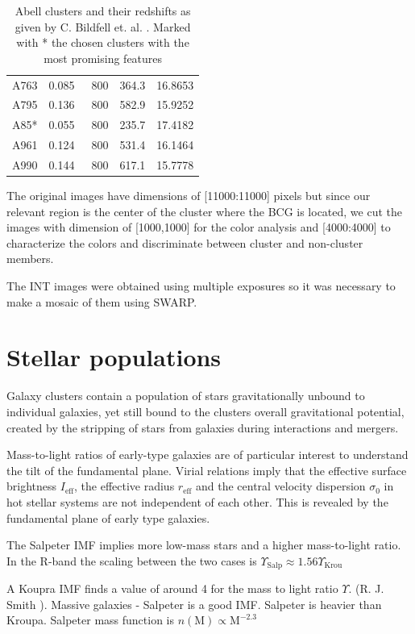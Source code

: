 \begin{table}[]
\begin{tabular}{ccccc}
A763    & 0.085 & ~800           & 364.3 & 16.8653   \\
A795    & 0.136 & ~800           & 582.9 & 15.9252   \\
A85*    & 0.055 & ~800           & 235.7 & 17.4182   \\
A961    & 0.124 & ~800           & 531.4 & 16.1464   \\
A990    & 0.144 & ~800           & 617.1 & 15.7778   
\end{tabular}
\caption[Abell Clusters and their redshift]{Abell clusters and their redshifts as given by C. Bildfell et. al. \citeyear{Reference6}. Marked with * the chosen clusters with the most promising features}
\end{table}

The original images have dimensions of [11000:11000] pixels but since our relevant region is the center of the cluster where the BCG is located, we cut the images with dimension of [1000,1000] for the color analysis and [4000:4000] to characterize the colors and discriminate between cluster and non-cluster members.

The INT images were obtained using multiple exposures so it was necessary to make a mosaic of them using SWARP.

\section{Stellar populations}
 
Galaxy clusters contain a population of stars gravitationally unbound to individual galaxies, yet still bound to the clusters overall gravitational potential, created by the stripping of stars from galaxies during interactions and mergers.

Mass-to-light ratios of early-type galaxies are of particular interest to understand the tilt of the fundamental plane. Virial relations imply that the effective surface brightness $I_{\text{eff}}$, the effective radius $r_{\text{eff}}$ and the central velocity dispersion $\sigma_{0}$ in hot stellar systems are not independent of each other. This is revealed by the fundamental plane of early type galaxies.

The Salpeter IMF implies more low-mass stars and a higher mass-to-light ratio. In the R-band the scaling between the two cases is $\Upsilon_{\text{Salp}}\approx 1.56\Upsilon_{\text{Krou}}$

A Koupra IMF finds a value of around 4 for the mass to light ratio $\Upsilon$. (R. J. Smith \citeyear{Reference5}). Massive galaxies - Salpeter is a good IMF. Salpeter is heavier than Kroupa. Salpeter mass function is $n(\textrm{M})\propto \textrm{M}^{-2.3}$ 

